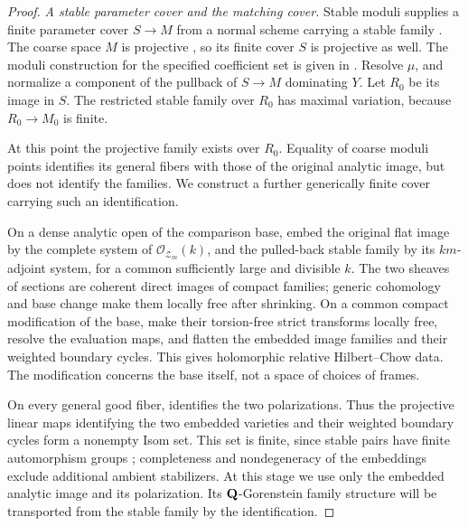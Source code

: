 \begin{proof}
\emph{A stable parameter cover and the matching cover.}
Stable moduli supplies a finite parameter cover
\(S\to M\) from a normal scheme carrying a stable family
\cite[Corollary~6.19]{KovacsPatakfalvi}.
The coarse space \(M\) is projective
\cite[Corollary~7.3]{KovacsPatakfalvi}, so its finite cover \(S\)
is projective as well. The moduli construction for the specified
coefficient set is given in
\cite[Definition~6.2, Proposition~6.4, and
Proposition~6.14]{KovacsPatakfalvi}.
Resolve \(\mu\), and normalize a component of the pullback of
\(S\to M\) dominating \(Y\).  Let \(R_0\) be its image in \(S\).
The restricted stable family over \(R_0\) has maximal variation,
because \(R_0\to M_0\) is finite.

At this point the projective family exists over \(R_0\).
Equality of coarse moduli points identifies its general fibers with
those of the original analytic image, but does not identify the
families. We construct a further generically finite cover carrying
such an identification.

On a dense analytic open of the comparison base, embed the original
flat image by the complete system of
\(\mathcal O_{\mathcal Z_m}(k)\), and the pulled-back stable family
by its \(km\)-adjoint system, for a common sufficiently large and
divisible \(k\). The two sheaves of sections are coherent direct
images of compact families; generic cohomology and base change make
them locally free after shrinking. On a common compact modification
of the base, make their torsion-free strict transforms locally free,
resolve the evaluation maps, and flatten the embedded image families
and their weighted boundary cycles. This gives holomorphic relative
Hilbert--Chow data. The modification concerns the base itself, not a
space of choices of frames.

On every general good fiber, 
identifies the two polarizations. Thus the projective linear maps
identifying the two embedded varieties and their weighted boundary
cycles form a nonempty Isom set. This set is finite, since stable
pairs have finite automorphism groups
\cite[Propositions~6.5 and~6.8]{KovacsPatakfalvi}; completeness and
nondegeneracy of the embeddings exclude additional ambient
stabilizers. At this stage we use only the embedded analytic image
and its polarization. Its \(\mathbf Q\)-Gorenstein family structure will
be transported from the stable family by the identification.


\end{proof}
